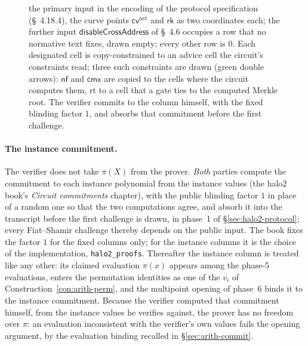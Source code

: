 \documentclass[11pt,a4paper]{article}
\theoremstyle{definition}
\newcommand{\nfsym}{\mathsf{nf}}
\newcommand{\cmx}{\mathsf{cmx}}
\newcommand{\cvsym}{\mathsf{cv}}
\newcommand{\rk}{\mathsf{rk}}
\begin{document}
\begin{figure}[htbp]
{the primary input in the encoding of the protocol specification
(\S~4.18.4), the curve points $\cvsym^{\mathrm{net}}$ and $\rk$ as two
coordinates each; the further input $\mathsf{disableCrossAddress}$ of
\S~4.6 occupies a row that no normative text fixes, drawn empty; every
other row is $0$. Each
designated cell is copy-constrained to an advice cell the circuit's
constraints read; three such constraints are drawn (green double
arrows): $\nfsym$ and $\cmx$ are copied to the cells where the circuit
computes them, $\mathrm{rt}$ to a cell that a gate ties to the computed
Merkle root. The verifier commits to the column himself, with the fixed
blinding factor $1$, and absorbs that commitment before the first
challenge.}
\label{fig:halo2-instance}
\end{figure}

\paragraph{The instance commitment.}
The verifier does not take $\pi(X)$ from the prover. \emph{Both} parties
compute the commitment to each instance polynomial from the instance
values (the halo2 book's \emph{Circuit commitments} chapter), with the
public blinding factor $1$ in place of a random one so that the two
computations agree, and absorb it into the transcript before the first
challenge is drawn, in phase~1 of \S\ref{sec:halo2-protocol}; every
Fiat--Shamir challenge thereby depends on the public input. The book
fixes the factor $1$ for the fixed columns only; for the instance columns
it is the choice of the implementation, \texttt{halo2\_proofs}.
Thereafter the instance column is treated like any other: its claimed
evaluation $\pi(x)$ appears among the phase-5 evaluations, enters the
permutation identities as one of the $v_i$ of
Construction~\ref{con:arith-perm}, and the multipoint opening of phase~6
binds it to the instance commitment. Because the verifier computed that
commitment himself, from the instance values he verifies against, the
prover has no freedom over $\pi$: an evaluation inconsistent with the
verifier's own values fails the opening argument, by the evaluation
binding recalled in \S\ref{sec:arith-commit}.
\end{document}
